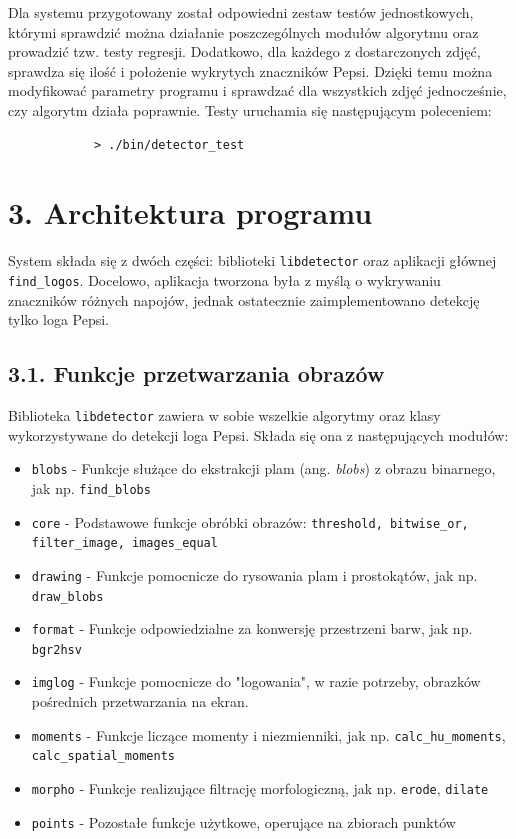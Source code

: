 \documentclass[11pt,a4paper,twoside]{report}
\begin{document}
		Dla systemu przygotowany został odpowiedni zestaw testów jednostkowych, którymi sprawdzić można działanie poszczególnych modułów algorytmu oraz prowadzić tzw. testy regresji. Dodatkowo, dla każdego z dostarczonych zdjęć, sprawdza się ilość i położenie wykrytych znaczników Pepsi. Dzięki temu można modyfikować parametry programu i sprawdzać dla wszystkich zdjęć jednocześnie, czy algorytm działa poprawnie. Testy uruchamia się następującym poleceniem:
		\begin{verbatim}
		    > ./bin/detector_test
		\end{verbatim}

\section*{3. Architektura programu}

	System składa się z dwóch części: biblioteki \texttt{libdetector} oraz aplikacji głównej \texttt{find\_logos}. Docelowo, aplikacja tworzona była z myślą o wykrywaniu znaczników różnych napojów, jednak ostatecznie zaimplementowano detekcję tylko loga Pepsi.

	\subsection*{3.1. Funkcje przetwarzania obrazów}

		Biblioteka \texttt{libdetector} zawiera w sobie wszelkie algorytmy oraz klasy wykorzystywane do detekcji loga Pepsi. Składa się ona z następujących modułów:
		\begin{itemize}
			\item \texttt{blobs} - Funkcje służące do ekstrakcji plam (ang. \emph{blobs}) z obrazu binarnego, jak np. \texttt{find\_blobs}
			\item \texttt{core} - Podstawowe funkcje obróbki obrazów: \texttt{threshold, bitwise\_or, filter\_image, images\_equal}
			\item \texttt{drawing} - Funkcje pomocnicze do rysowania plam i prostokątów, jak np. \texttt{draw\_blobs}
			\item \texttt{format} - Funkcje odpowiedzialne za konwersję przestrzeni barw, jak np. \texttt{bgr2hsv}
			\item \texttt{imglog} - Funkcje pomocnicze do "logowania", w razie potrzeby, obrazków pośrednich przetwarzania na ekran.
			\item \texttt{moments} - Funkcje liczące momenty i niezmienniki, jak np. \texttt{calc\_hu\_moments}, \texttt{calc\_spatial\_moments}
			\item \texttt{morpho} - Funkcje realizujące filtrację morfologiczną, jak np. \texttt{erode}, \texttt{dilate}
			\item \texttt{points} - Pozostałe funkcje użytkowe, operujące na zbiorach punktów
		\end{itemize}
\end{document}
